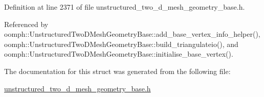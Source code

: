 Definition at line 2371 of file unstructured\+\_\+two\+\_\+d\+\_\+mesh\+\_\+geometry\+\_\+base.\+h.



Referenced by oomph\+::\+Unstructured\+Two\+D\+Mesh\+Geometry\+Base\+::add\+\_\+base\+\_\+vertex\+\_\+info\+\_\+helper(), oomph\+::\+Unstructured\+Two\+D\+Mesh\+Geometry\+Base\+::build\+\_\+triangulateio(), and oomph\+::\+Unstructured\+Two\+D\+Mesh\+Geometry\+Base\+::initialise\+\_\+base\+\_\+vertex().



The documentation for this struct was generated from the following file\+:\begin{DoxyCompactItemize}
\item 
\hyperlink{unstructured__two__d__mesh__geometry__base_8h}{unstructured\+\_\+two\+\_\+d\+\_\+mesh\+\_\+geometry\+\_\+base.\+h}\end{DoxyCompactItemize}

